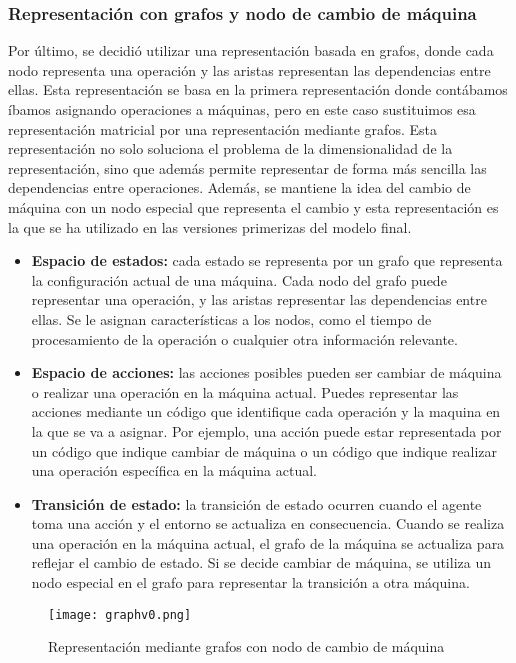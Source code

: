 \subsubsection{Representación con grafos y nodo de cambio de máquina}
Por último, se decidió utilizar una representación basada en grafos, donde cada nodo
representa una operación y las aristas representan las dependencias entre ellas. Esta
representación se basa en la primera representación donde contábamos íbamos asignando
operaciones a máquinas, pero en este caso sustituimos esa representación matricial por
una representación mediante grafos. Esta representación no solo soluciona el problema
de la dimensionalidad de la representación, sino que además permite representar de
forma más sencilla las dependencias entre operaciones. Además, se mantiene la idea del
cambio de máquina con un nodo especial que representa el cambio y esta representación
es la que se ha utilizado en las versiones primerizas del modelo final.

\begin{itemize}
    \item \textbf{Espacio de estados:} cada estado se representa por un grafo 
    que representa la configuración actual de una máquina. Cada nodo del grafo puede representar 
    una operación, y las aristas representar las dependencias entre ellas. Se le asignan
    características a los nodos, como el tiempo de procesamiento de la operación o cualquier 
    otra información relevante.
    \item \textbf{Espacio de acciones:} las acciones posibles pueden ser cambiar de máquina 
    o realizar una operación en la máquina actual. Puedes representar las acciones mediante 
    un código que identifique cada operación y la maquina en la que se va a asignar. Por 
    ejemplo, una acción puede estar representada por un código que indique cambiar de máquina o 
    un código que indique realizar una operación específica en la máquina actual.
    \item \textbf{Transición de estado:} la transición de estado ocurren cuando el agente 
    toma una acción y el entorno se actualiza en consecuencia. Cuando se realiza una operación 
    en la máquina actual, el grafo de la máquina se actualiza para reflejar el cambio de estado. 
    Si se decide cambiar de máquina, se utiliza un nodo especial en el grafo para representar 
    la transición a otra máquina.
\end{itemize}
\begin{figure}[ht]
    \centering
    \texttt{[image: graphv0.png]}
    \caption{Representación mediante grafos con nodo de cambio de máquina}
    \label{fig:rep-graph-v0}
\end{figure}
